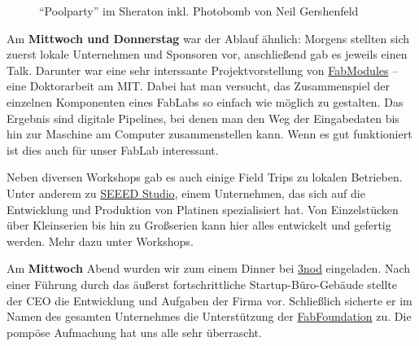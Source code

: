 \documentclass{\basedir/fablab-document}
\begin{document}
\begin{figure}[htbp]
	\noindent{}
	\caption{``Poolparty'' im Sheraton inkl. Photobomb von Neil Gershenfeld}
	\label{photobomb-neil}
\end{figure}

Am \textbf{Mittwoch und Donnerstag} war der Ablauf ähnlich: Morgens
stellten sich zuerst lokale Unternehmen und Sponsoren vor, anschließend
gab es jeweils einen Talk. Darunter war eine sehr interssante
Projektvorstellung von \href{http://fabmodules.org/}{FabModules} -- eine
Doktorarbeit am MIT. Dabei hat man versucht, das Zusammenspiel der
einzelnen Komponenten eines FabLabs so einfach wie möglich zu gestalten.
Das Ergebnis sind digitale Pipelines, bei denen man den Weg der
Eingabedaten bis hin zur Maschine am Computer zusammenstellen kann. Wenn
es gut funktioniert ist dies auch für unser FabLab interessant.

Neben diversen Workshops gab es auch einige Field Trips zu lokalen
Betrieben. Unter anderem zu \href{https://www.seeedstudio.com/}{SEEED
Studio}, einem Unternehmen, das sich auf die Entwicklung und Produktion
von Platinen spezialisiert hat. Von Einzelstücken über Kleinserien bis
hin zu Großserien kann hier alles entwickelt und gefertig werden. Mehr
dazu unter Workshops.

Am \textbf{Mittwoch} Abend wurden wir zum einem Dinner bei 
\href{https://www.3nod.com.cn/en/}{3nod} eingeladen. Nach einer
Führung durch das äußerst fortschrittliche Startup-Büro-Gebäude stellte
der CEO die Entwicklung und Aufgaben der Firma vor.
Schließlich sicherte er im Namen des gesamten Unternehmes die
Unterstützung der \href{https://fabfoundation.org/}{FabFoundation} zu.
Die pompöse Aufmachung hat uns alle sehr überrascht.
\end{document}
